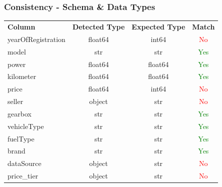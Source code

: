 \documentclass[12pt, a4paper]{article}
\begin{document}
\vspace{0.2cm}

\subsubsection{Consistency - Schema \& Data Types}
\vspace{0.25cm}

\begin{center}
\renewcommand{\arraystretch}{1.4}
\begin{tabular}{l c c c}
\rowcolor{slate}
{\color{white}\small\bfseries Column} &
{\color{white}\small\bfseries Detected Type} &
{\color{white}\small\bfseries Expected Type} &
{\color{white}\small\bfseries Match} \\
\rowcolor{white} yearOfRegistration & float64 & int64 & \textcolor{red}{No} \\
\rowcolor{lightgray} model & str & str & \textcolor{green}{Yes} \\
\rowcolor{white} power & float64 & float64 &\textcolor{green}{Yes} \\
\rowcolor{lightgray} kilometer & float64 & float64 & \textcolor{green}{Yes} \\
\rowcolor{white} price & float64 & int64 & \textcolor{red}{No} \\
\rowcolor{lightgray} seller & object & str &\textcolor{red}{No} \\
\rowcolor{white} gearbox & str & str & \textcolor{green}{Yes} \\
\rowcolor{lightgray} vehicleType & str & str & \textcolor{green}{Yes} \\
\rowcolor{white} fuelType & str & str & \textcolor{green}{Yes} \\
\rowcolor{lightgray} brand & str & str & \textcolor{green}{Yes} \\
\rowcolor{white} dataSource & object & str & \textcolor{red}{No} \\
\rowcolor{lightgray} price\_tier & object & str & \textcolor{red}{No} \\
\end{tabular}
\end{center}
\vspace{0.2cm}
\end{document}
